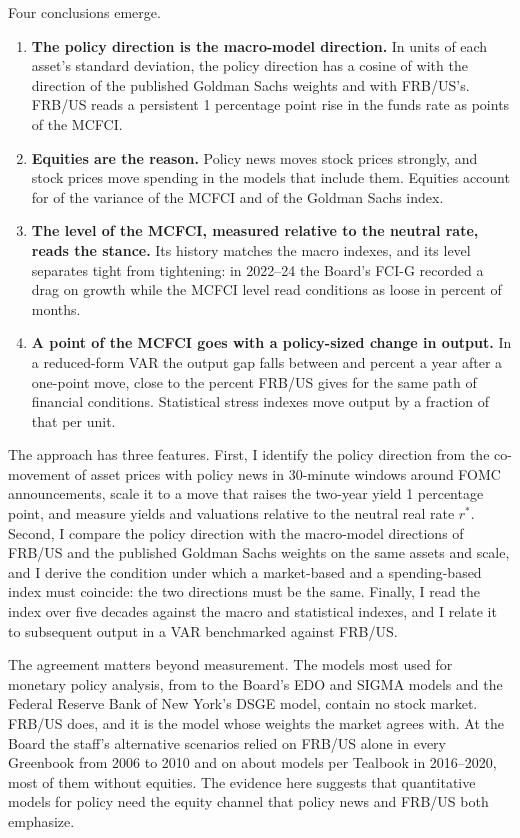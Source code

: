 \documentclass[11pt]{article}
\newcommand{\rs}{r^{*}}
\begin{document}
Four conclusions emerge.
\begin{enumerate}\setlength\itemsep{0pt}
\item \textbf{The policy direction is the macro-model direction.} In units of each asset's standard deviation, the policy direction has a cosine of  with the direction of the published Goldman Sachs weights and  with FRB/US's. FRB/US reads a persistent 1 percentage point rise in the funds rate as  points of the MCFCI.
\item \textbf{Equities are the reason.} Policy news moves stock prices strongly, and stock prices move spending in the models that include them. Equities account for  of the variance of the MCFCI and  of the Goldman Sachs index.
\item \textbf{The level of the MCFCI, measured relative to the neutral rate, reads the stance.} Its history matches the macro indexes, and its level separates tight from tightening: in 2022--24 the Board's FCI-G recorded a drag on growth while the MCFCI level read conditions as loose in  percent of months.
\item \textbf{A point of the MCFCI goes with a policy-sized change in output.} In a reduced-form VAR the output gap falls between  and  percent a year after a one-point move, close to the  percent FRB/US gives for the same path of financial conditions. Statistical stress indexes move output by a fraction of that per unit.
\end{enumerate}

The approach has three features. First, I identify the policy direction from the co-movement of asset prices with policy news in 30-minute windows around FOMC announcements, scale it to a move that raises the two-year yield 1 percentage point, and measure yields and valuations relative to the neutral real rate $\rs$. Second, I compare the policy direction with the macro-model directions of FRB/US and the published Goldman Sachs weights on the same assets and scale, and I derive the condition under which a market-based and a spending-based index must coincide: the two directions must be the same. Finally, I read the index over five decades against the macro and statistical indexes, and I relate it to subsequent output in a VAR benchmarked against FRB/US.

The agreement matters beyond measurement. The models most used for monetary policy analysis, from \citet{smets2007} to the Board's EDO and SIGMA models and the Federal Reserve Bank of New York's DSGE model, contain no stock market. FRB/US does, and it is the model whose weights the market agrees with. At the Board the staff's alternative scenarios relied on FRB/US alone in every Greenbook from 2006 to 2010 and on about  models per Tealbook in 2016--2020, most of them without equities. The evidence here suggests that quantitative models for policy need the equity channel that policy news and FRB/US both emphasize.
\end{document}
